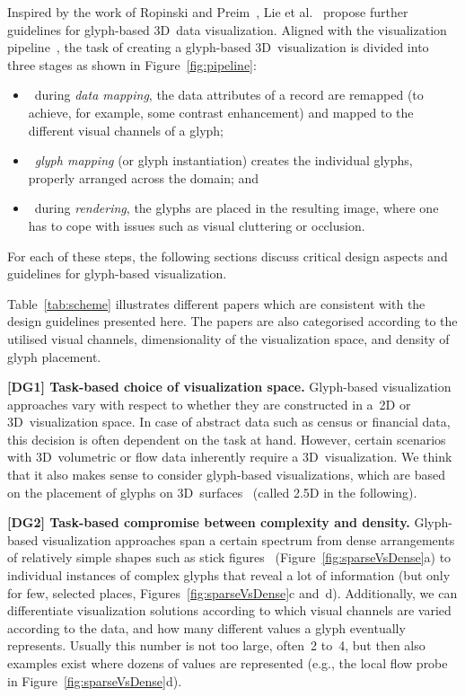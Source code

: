 Inspired by the work of Ropinski and Preim~\cite{ropinskiPreim08glyphTaxonomy},
Lie et al.~\cite{lie09glyphs} propose further guidelines for glyph-based 3D~data visualization.
Aligned with the visualization pipeline~\cite{hauserSchumann09pipeline},
the task of creating a glyph-based 3D~visualization is divided into three stages as shown in Figure~\ref{fig:pipeline}:
\begin{itemize}
\item ~during \emph{data mapping}, the data attributes of a record are remapped (to achieve, for example, some contrast enhancement) and mapped to the different visual channels of a glyph; 
\item ~\emph{glyph mapping} (or glyph instantiation) creates the individual glyphs, properly arranged across the domain; and 
\item ~during \emph{rendering}, the glyphs are placed in the resulting image, where one has to cope with issues such as visual cluttering or occlusion.
\end{itemize}
For each of these steps, the following sections discuss critical design aspects and guidelines for glyph-based visualization. %






Table~\ref{tab:scheme} illustrates different papers which are consistent with the design guidelines presented here.
The papers are also categorised according to the utilised visual channels, dimensionality of the visualization space, and density of glyph placement.

\textbf{[DG1] Task-based choice of visualization space.}
Glyph-based visualization approaches vary with respect to whether they are constructed in a~2D or 3D~visualization space.
In case of abstract data such as census or financial data,
this decision is often dependent on the task at hand.
However, certain scenarios with 3D~volumetric or flow data inherently require
a 3D~visualization.
We think that it also makes sense to consider glyph-based visualizations, which are based on the placement of glyphs on 3D~surfaces~\cite{ropinski07surfaceglyphs} (called 2.5D in the following).


\textbf{[DG2] Task-based compromise between complexity and density.}
Glyph-based visualization approaches span a certain spectrum from dense arrangements of relatively simple shapes such as stick figures~\cite{pickettGrinstein88iconic} (Figure~\ref{fig:sparseVsDense}a) to individual instances of complex glyphs that reveal a lot of 
information (but only for few, selected places, Figures~\ref{fig:sparseVsDense}c and~d).
Additionally, we can differentiate visualization solutions according to 
which visual channels are varied according to the data,
and how many different values a glyph eventually represents.
Usually this number is not too large, often~2 to~4, but then also 
examples exist where dozens of values are represented (e.g., the local flow probe~\cite{deLeeuwVanWijk93probe} in Figure~\ref{fig:sparseVsDense}d).

